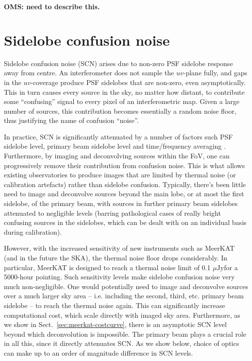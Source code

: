 \documentclass{aa}
\newcommand{\uJy}{$\mu\mathrm{Jy}$}
\begin{document}
{\bf OMS: need to describe this.}


\section{Sidelobe confusion noise}
\label{sec:fsn}

Sidelobe confusion noise (SCN) arises due to non-zero PSF sidelobe response away from centre. An interferometer does not sample the $uv$-plane fully, and gaps in the $uv$-coverage produce PSF sidelobes that are non-zero, even asymptotically. This in turn causes every source in the sky, no matter how distant, to contribute some ``confusing'' signal to every pixel of an interferometric map. Given a large number of sources, this contribution becomes essentially a random noise floor, thus justifying the name of confusion ``noise''.

In practice, SCN is significantly attenuated by a number of factors such PSF sidelobe level, primary beam sidelobe level and time/frequency averaging \citep[see Fig.~2 in][for an illustration]{SKA54-expa,SKA54}. Furthermore, by imaging and deconvolving sources within the FoV, one can progressively remove their contribution from confusion noise. This is what allows existing observatories to produce images that are limited by thermal noise (or calibration artefacts) rather than sidelobe confusion. Typically, there's been little need to image and deconvolve sources beyond the main lobe, or at most the first sidelobe, of the primary beam, with sources in further primary beam sidelobes attenuated to negligible levels (barring pathological cases of really bright confusing sources in the sidelobes, which can be dealt with on an individual basis during calibration).

However, with the increased sensitivity of new instruments such as MeerKAT (and in the future the SKA), the thermal noise floor drops considerably. In particular, MeerKAT is designed to reach a thermal noise limit of 0.1 \uJy for a 5000-hour pointing. Such sensitivity levels make sidelobe confusion noise very much non-negligible. One would potentially need to image and deconvolve sources over a much larger sky area -- i.e. including the second, third, etc. primary beam sidelobe -- to reach the thermal noise again. This can significantly increase computational cost, which scale directly with imaged sky area. Furthermore, as we show in Sect.~\ref{sec:meerkat-costcurve}, there is an asymptotic SCN level beyond which deconvolution is impossible. The primary beam plays a crucial role in all this, since it directly attenuates SCN. As we show below, choice of optics can make up to an order of magnitude difference in SCN levels.
\end{document}
